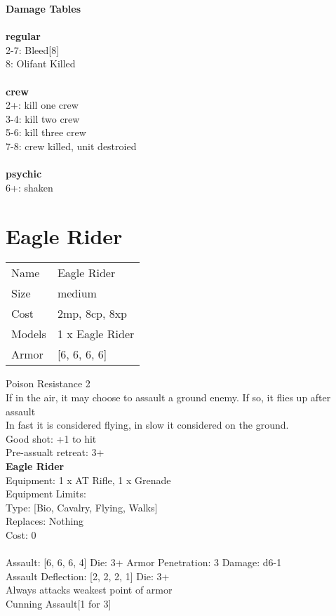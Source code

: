 {\bf Damage Tables} \\
\ \\ {\bf regular } \\
2-7: Bleed[8] \\
8: Olifant Killed \\
\ \\ {\bf crew } \\
2+: kill one crew \\
3-4: kill two crew \\
5-6: kill three crew \\
7-8: crew killed, unit destroied \\
\ \\ {\bf psychic } \\
6+: shaken \\










\pagebreak\pagebreak

\section{ Eagle Rider }

\begin{tabular}{ll}
  Name & Eagle Rider \\
  Size & medium\\
  Cost & 2mp, 8cp, 8xp\\
  Models & 1 x Eagle Rider\\
  Armor & [6, 6, 6, 6]\\
\end{tabular}

\noindent Poison Resistance 2\\ 
If in the air, it may choose to assault a ground enemy. If so, it flies up after assault\\ 
In fast it is considered flying, in slow it considered on the ground.\\ 
Good shot: +1 to hit\\ 
Pre-assualt retreat: 3+\\ 


{\bf Eagle Rider } \\
Equipment: 1 x AT Rifle, 1 x Grenade \\
Equipment Limits:  \\
Type: [Bio, Cavalry, Flying, Walks] \\
Replaces: Nothing \\
Cost: 0\\
\ \\
Assault: [6, 6, 6, 4] Die: 3+ Armor Penetration: 3 Damage: d6-1 \\
Assault Deflection: [2, 2, 2, 1] Die: 3+\\
\indent Always attacks weakest point of armor\\ 
Cunning Assault[1 for 3]\\ 
 
